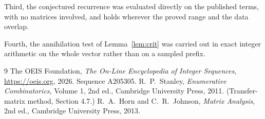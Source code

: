 \documentclass[11pt,a4paper]{article}
\theoremstyle{plain}
\theoremstyle{definition}
\begin{document}
Third, the conjectured recurrence was evaluated directly on the published terms, with no
matrices involved, and holds wherever the proved range and the data overlap.

Fourth, the annihilation test of Lemma~\ref{lem:crit} was carried out in exact integer
arithmetic on the whole vector rather than on a sampled prefix.

\begin{thebibliography}{9}
 The OEIS Foundation, \emph{The On-Line Encyclopedia of Integer
Sequences}, \url{https://oeis.org}, 2026. Sequence A205305.
 R.~P.~Stanley, \emph{Enumerative Combinatorics}, Volume 1, 2nd ed.,
Cambridge University Press, 2011. (Transfer-matrix method, Section 4.7.)
 R.~A.~Horn and C.~R.~Johnson, \emph{Matrix Analysis}, 2nd ed., Cambridge
University Press, 2013.
\end{thebibliography}
\end{document}

